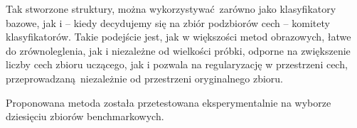 \documentclass[]{article}
\begin{document}
Tak stworzone struktury, można wykorzystywać zarówno jako klasyfikatory bazowe, jak i -- kiedy decydujemy się na zbiór podzbiorów cech -- komitety klasyfikatorów. Takie podejście jest, jak w większości metod obrazowych, łatwe do zrównoleglenia, jak i niezależne od wielkości próbki, odporne na zwiększenie liczby cech zbioru uczącego, jak i pozwala na regularyzację w przestrzeni cech, przeprowadzaną niezależnie od przestrzeni oryginalnego zbioru.

Proponowana metoda została przetestowana eksperymentalnie na wyborze dziesięciu zbiorów benchmarkowych.

\end{document}
